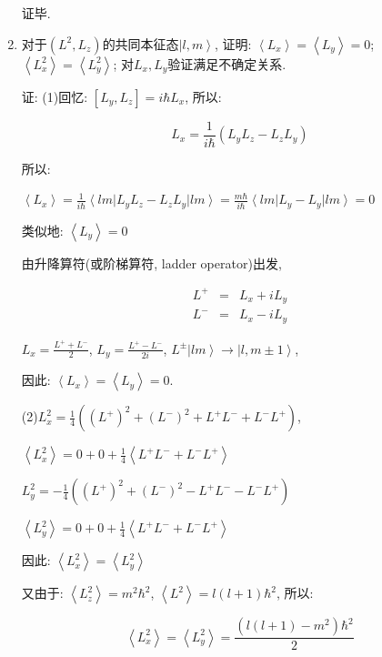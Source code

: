\begin{enumerate}
证毕.


\item 对于$\left( L^2, L_z \right)$的共同本征态$\left|l,m \right\rangle$, 证明: $\left\langle L_x \right\rangle = \left\langle L_y \right\rangle = 0$; $\left\langle L_x^2 \right\rangle = \left\langle L_y^2 \right\rangle $; 对$L_x, L_y$验证满足不确定关系.

证: (1)回忆: $[L_y, L_z] =i\hbar L_x$, 所以:

\begin{equation*}
L_x = \frac{1}{i\hbar}(L_y L_z-L_zL_y)
\end{equation*}


所以:

$\left\langle L_x \right\rangle = \frac{1}{i\hbar} \left\langle lm
\right| L_y L_z-L_zL_y \left| lm \right\rangle = \frac{m\hbar}{i
\hbar} \left\langle lm \right| L_y - L_y \left| lm \right\rangle =
0$

类似地: $\left\langle L_y \right\rangle = 0$

由升降算符(或阶梯算符, ladder operator)出发,

\begin{eqnarray*}
  L^+ &=& L_x + i L_y \\
  L^- &=& L_x - i L_y
\end{eqnarray*}



$L_x = \frac{L^+ + L^-}{2}$, $L_y = \frac{L^+ - L^-}{2i}$, $L^{\pm}
\left|lm \right\rangle \to \left|l,m \pm 1 \right\rangle $,

因此: $\left\langle L_x \right\rangle = \left\langle L_y
\right\rangle = 0$.

(2)$L_x^2 = \frac{1}{4}\left((L^+)^2 + (L^-)^2 + L^+ L^- + L^-
L^+\right)$,

$\left\langle L_x^2 \right\rangle = 0 + 0 + \frac{1}{4} \left\langle
L^+ L^- + L^- L^+ \right\rangle$



$L_y^2 = - \frac{1}{4}\left((L^+)^2 + (L^-)^2 - L^+ L^- - L^-
L^+\right)$

$\left\langle L_y^2 \right\rangle = 0 + 0 + \frac{1}{4} \left\langle
L^+ L^- + L^- L^+ \right\rangle$

因此: $\left\langle L_x^2 \right\rangle = \left\langle L_y^2
\right\rangle$

又由于: $ \left\langle L_z^2 \right\rangle = m^2 \hbar^2 $, $
\left\langle L^2 \right\rangle =l(l+1)\hbar^2 $, 所以:

\begin{equation*}
\left\langle L_x^2 \right\rangle = \left\langle L_y^2 \right\rangle
= \frac{(l(l+1)-m^2)\hbar^2}{2}
\end{equation*}



\end{enumerate}

